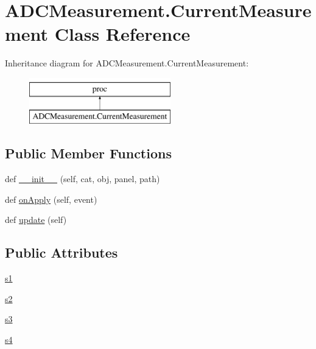 \hypertarget{classADCMeasurement_1_1CurrentMeasurement}{}\section{A\+D\+C\+Measurement.\+Current\+Measurement Class Reference}
\label{classADCMeasurement_1_1CurrentMeasurement}
Inheritance diagram for A\+D\+C\+Measurement.\+Current\+Measurement\+:\begin{figure}[H]
\begin{center}
\leavevmode
\includegraphics[height=2.000000cm]{classADCMeasurement_1_1CurrentMeasurement}
\end{center}
\end{figure}
\subsection*{Public Member Functions}
\begin{DoxyCompactItemize}
\item 
def \hyperlink{classADCMeasurement_1_1CurrentMeasurement_a0a2d0af1a969198d474d3f1fcd656d87}{\+\_\+\+\_\+init\+\_\+\+\_\+} (self, cat, obj, panel, path)
\item 
def \hyperlink{classADCMeasurement_1_1CurrentMeasurement_a1ae6055f5228952c14ea04fe83db0cb4}{on\+Apply} (self, event)
\item 
def \hyperlink{classADCMeasurement_1_1CurrentMeasurement_af3fb35c2334ccea6ac6274604bf09703}{update} (self)
\end{DoxyCompactItemize}
\subsection*{Public Attributes}
\begin{DoxyCompactItemize}
\item 
\hyperlink{classADCMeasurement_1_1CurrentMeasurement_ab3415b829a716f76fc9503aa932fa0b7}{s1}
\item 
\hyperlink{classADCMeasurement_1_1CurrentMeasurement_a7bf546778b1b2e06ae9b3c07b8bccb95}{s2}
\item 
\hyperlink{classADCMeasurement_1_1CurrentMeasurement_a6fb15bf8899950a9cb87f35c33595586}{s3}
\item 
\hyperlink{classADCMeasurement_1_1CurrentMeasurement_a506aa9010df3a05e20606be1ee4f4c5b}{s4}
\end{DoxyCompactItemize}


